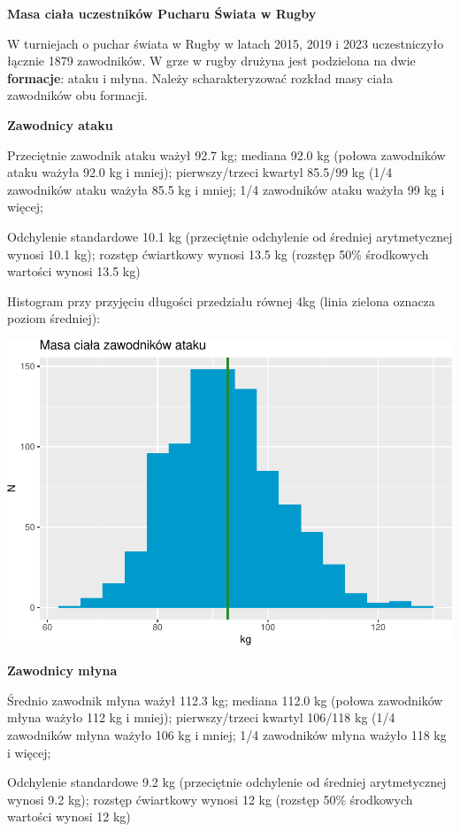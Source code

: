 \documentclass[
  openany]{book}
\begin{document}
\begin{example}
\textbf{Masa ciała uczestników Pucharu Świata w Rugby}

W turniejach o puchar świata w Rugby w latach 2015, 2019 i 2023 uczestniczyło łącznie 1879 zawodników.
W grze w rugby drużyna jest podzielona na dwie \textbf{formacje}: ataku i młyna. Należy scharakteryzować
rozkład masy ciała zawodników obu formacji.

\textbf{Zawodnicy ataku}

Przeciętnie zawodnik ataku ważył 92.7 kg;
mediana 92.0 kg (połowa
zawodników ataku ważyła 92.0 kg i mniej);
pierwszy/trzeci kwartyl 85.5/99 kg (1/4 zawodników
ataku ważyła 85.5 kg i mniej;
1/4 zawodników ataku ważyła 99 kg i więcej;

Odchylenie standardowe 10.1 kg (przeciętnie
odchylenie od średniej arytmetycznej wynosi 10.1 kg);
rozstęp ćwiartkowy wynosi 13.5 kg (rozstęp 50\% środkowych wartości
wynosi 13.5 kg)

Histogram przy przyjęciu długości przedziału równej 4kg
(linia zielona oznacza poziom średniej):

\includegraphics{_main_files/figure-latex/unnamed-chunk-14-1.pdf}

\textbf{Zawodnicy młyna}

Średnio zawodnik młyna ważył 112.3 kg;
mediana 112.0 kg (połowa zawodników
młyna ważyło 112 kg i mniej);
pierwszy/trzeci kwartyl 106/118 kg (1/4 zawodników
młyna ważyło 106 kg i mniej;
1/4 zawodników młyna ważyło 118 kg i więcej;

Odchylenie standardowe 9.2 kg (przeciętnie
odchylenie od średniej arytmetycznej wynosi 9.2 kg);
rozstęp ćwiartkowy wynosi 12 kg (rozstęp 50\% środkowych wartości
wynosi 12 kg)


\end{example}
\end{document}
